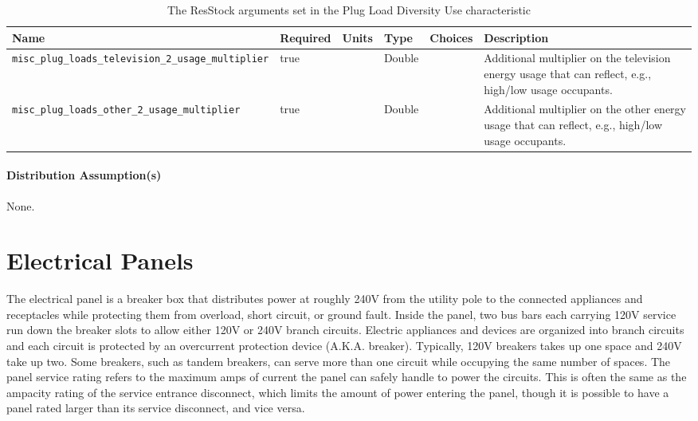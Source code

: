 \begin{longtable}[]{|p{}|p{1.5cm}|p{1.3cm}|p{1.1cm}|p{}|p{}|} \caption{The ResStock arguments set in the Plug Load Diversity Use characteristic} \label{table:hc_arg_def_plug_load_diversity}  \\
\toprule\noalign{}
Name & Required & Units & Type & Choices & Description \\
\midrule\noalign{}
\endhead
\bottomrule\noalign{}
\endlastfoot
\texttt{misc\_plug\_loads\_television\_2\_usage\_multiplier} & true & &
Double & & Additional multiplier on the television energy usage that can
reflect, e.g., high/low usage occupants. \\
\hline
\texttt{misc\_plug\_loads\_other\_2\_usage\_multiplier} & true & &
Double & & Additional multiplier on the other energy usage that can
reflect, e.g., high/low usage occupants. \\
\end{longtable}



\paragraph{Distribution Assumption(s)}
None. 

\section{Electrical Panels}
The electrical panel is a breaker box that distributes power at roughly 240V from the utility pole to the connected appliances and receptacles while protecting them from overload, short circuit, or ground fault. Inside the panel, two bus bars each carrying 120V service run down the breaker slots to allow either 120V or 240V branch circuits. Electric appliances and devices are organized into branch circuits and each circuit is protected by an overcurrent protection device (A.K.A. breaker). Typically, 120V breakers takes up one space and 240V take up two. Some breakers, such as tandem breakers, can serve more than one circuit while occupying the same number of spaces. The panel service rating refers to the maximum amps of current the panel can safely handle to power the circuits. This is often the same as the ampacity rating of the service entrance disconnect, which limits the amount of power entering the panel, though it is possible to have a panel rated larger than its service disconnect, and vice versa. 

